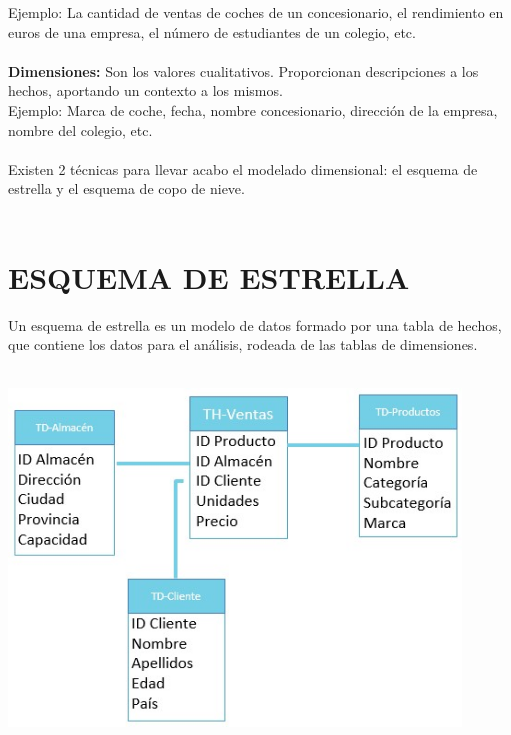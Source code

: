 Ejemplo: La cantidad de ventas de coches de un concesionario, el rendimiento en euros de una empresa, el número de estudiantes de un colegio, etc.\\\\
\textbf{Dimensiones:} Son los valores cualitativos. Proporcionan descripciones a los hechos, aportando un contexto a los mismos.\\
Ejemplo: Marca de coche, fecha, nombre concesionario, dirección de la empresa, nombre del colegio, etc.\\\\
Existen 2 técnicas para llevar acabo el modelado dimensional: el esquema de estrella y el esquema de copo de nieve.\\\\

\section{ESQUEMA DE ESTRELLA}

Un esquema de estrella es un modelo de datos formado por una tabla de hechos, que contiene los datos para el análisis, rodeada de las tablas de dimensiones.\\\\

\begin{center}
\includegraphics[width=12cm]{./Imagenes/imag1}
\end{center}

